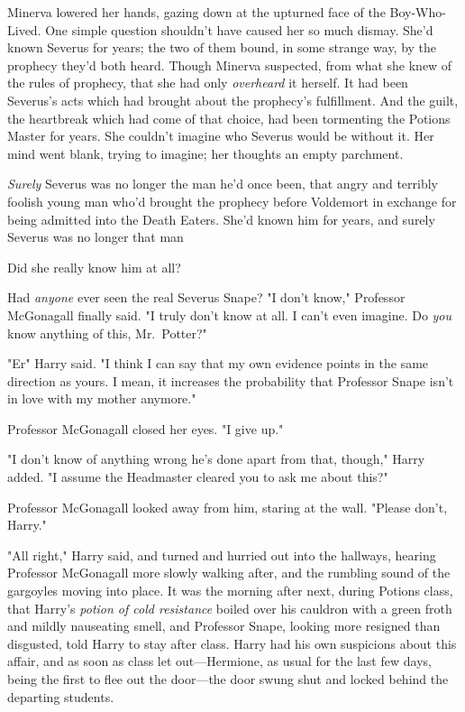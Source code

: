 Minerva lowered her hands, gazing down at the upturned face of the
Boy-Who-Lived. One simple question shouldn't have caused her so much dismay.
She'd known Severus for years; the two of them bound, in some strange way, by
the prophecy they'd both heard. Though Minerva suspected, from what she knew of
the rules of prophecy, that she had only \emph{overheard} it herself. It had
been Severus's acts which had brought about the prophecy's fulfillment. And the
guilt, the heartbreak which had come of that choice, had been tormenting the
Potions Master for years. She couldn't imagine who Severus would be without it.
Her mind went blank, trying to imagine; her thoughts an empty parchment.

\emph{Surely} Severus was no longer the man he'd once been, that angry and
terribly foolish young man who'd brought the prophecy before Voldemort in
exchange for being admitted into the Death Eaters. She'd known him for years,
and surely Severus was no longer that man{\el}

Did she really know him at all?

Had \emph{anyone} ever seen the real Severus Snape?
\sbreak
"I don't know," Professor McGonagall finally said. "I truly don't know at all.
I can't even imagine. Do \emph{you} know anything of this, Mr.~Potter?"

"Er{\el}" Harry said. "I think I can say that my own evidence points in the
same direction as yours. I mean, it increases the probability that Professor
Snape isn't in love with my mother anymore."

Professor McGonagall closed her eyes. "I give up."

"I don't know of anything wrong he's done apart from that, though," Harry
added. "I assume the Headmaster cleared you to ask me about this?"

Professor McGonagall looked away from him, staring at the wall. "Please don't,
Harry."

"All right," Harry said, and turned and hurried out into the hallways, hearing
Professor McGonagall more slowly walking after, and the rumbling sound of the
gargoyles moving into place.
\sbreak
It was the morning after next, during Potions class, that Harry's \emph{potion
of cold resistance} boiled over his cauldron with a green froth and mildly
nauseating smell, and Professor Snape, looking more resigned than disgusted,
told Harry to stay after class. Harry had his own suspicions about this affair,
and as soon as class let out---Hermione, as usual for the last few days, being
the first to flee out the door---the door swung shut and locked behind the
departing students.

